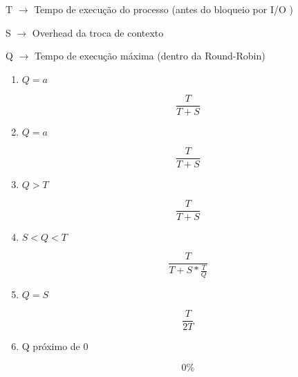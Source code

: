 \begin{question}
  
    T $\rightarrow$ Tempo de execução do processo (antes do bloqueio por I/O )

    S $\rightarrow$ Overhead da troca de contexto

    Q $\rightarrow$ Tempo de execução máxima (dentro da Round-Robin)

    \begin{enumerate}[label=\textbf{\alph*})]

        \item $ Q = a $
        
        \begin{equation*}
            \frac{T}{T+S}
        \end{equation*}
        
        \item $ Q = a $
        
        \begin{equation*}
            \frac{T}{T+S}
        \end{equation*}

        \item $ Q > T $
        
        \begin{equation*}
            \frac{T}{T+S}
        \end{equation*}

        \item $ S < Q < T $
        
        \begin{equation*}
            \frac{T}{T+S*\frac{T}{Q}}
        \end{equation*}

        \item $ Q = S $
        
        \begin{equation*}
            \frac{T}{2T}
        \end{equation*}

        \item Q próximo de 0
        
        \begin{equation*}
            0\%
        \end{equation*}

    \end{enumerate}

\end{question}
